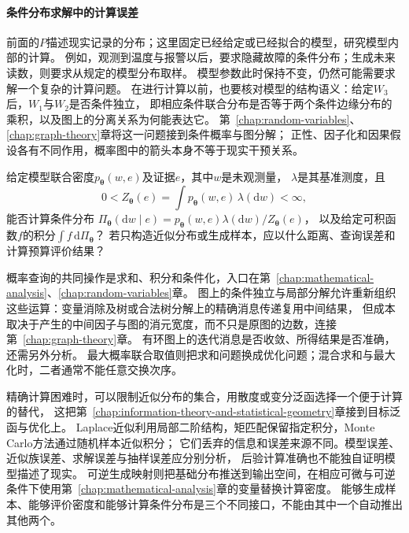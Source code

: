 \paragraph{条件分布求解中的计算误差}
\label{sec:future-analysis-probabilistic-query}

前面的$P$描述现实记录的分布；这里固定已经给定或已经拟合的模型，研究模型内部的计算。
例如，观测到温度与报警以后，要求隐藏故障的条件分布；生成未来读数，则要求从规定的模型分布取样。
模型参数此时保持不变，仍然可能需要求解一个复杂的计算问题。
在进行计算以前，也要核对模型的结构语义：给定$W_3$后，$W_1$与$W_2$是否条件独立，
即相应条件联合分布是否等于两个条件边缘分布的乘积，以及图上的分离关系为何能表达它。
第~\ref{chap:random-variables}、\ref{chap:graph-theory}章将这一问题接到条件概率与图分解；
正性、因子化和因果假设各有不同作用，概率图中的箭头本身不等于现实干预关系。

\begin{mathproblem}
  \label{question:future-probabilistic-query}
  给定模型联合密度$p_{\bm\theta}(w,e)$及证据$e$，其中$w$是未观测量，
  $\lambda$是其基准测度，且
  \[
    0<Z_{\bm\theta}(e)=\int p_{\bm\theta}(w,e)\,\lambda(\mathrm dw)<\infty,
  \]
  能否计算条件分布
  $\Pi_{\bm\theta}(\mathrm dw\mid e)=p_{\bm\theta}(w,e)\lambda(\mathrm dw)/Z_{\bm\theta}(e)$，
  以及给定可积函数$f$的积分$\int f\,\mathrm d\Pi_{\bm\theta}$？
  若只构造近似分布或生成样本，应以什么距离、查询误差和计算预算评价结果？
\end{mathproblem}

概率查询的共同操作是求和、积分和条件化，入口在第~\ref{chap:mathematical-analysis}、\ref{chap:random-variables}章。
图上的条件独立与局部分解允许重新组织这些运算：变量消除及树或合法树分解上的精确消息传递复用中间结果，
但成本取决于产生的中间因子与图的消元宽度，而不只是原图的边数，连接第~\ref{chap:graph-theory}章。
有环图上的迭代消息是否收敛、所得结果是否准确，还需另外分析。
最大概率联合取值则把求和问题换成优化问题；混合求和与最大化时，二者通常不能任意交换次序。

精确计算困难时，可以限制近似分布的集合，用散度或变分泛函选择一个便于计算的替代，
这把第~\ref{chap:information-theory-and-statistical-geometry}章接到目标泛函与优化上。
Laplace近似利用局部二阶结构，矩匹配保留指定积分，Monte Carlo方法通过随机样本近似积分；
它们丢弃的信息和误差来源不同。模型误差、近似族误差、求解误差与抽样误差应分别分析，
后验计算准确也不能独自证明模型描述了现实。
可逆生成映射则把基础分布推送到输出空间，在相应可微与可逆条件下使用第~\ref{chap:mathematical-analysis}章的变量替换计算密度。
能够生成样本、能够评价密度和能够计算条件分布是三个不同接口，不能由其中一个自动推出其他两个。

